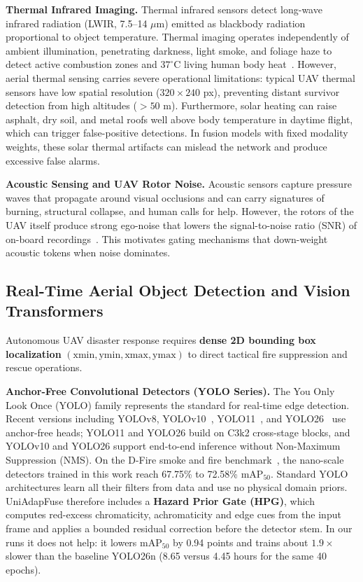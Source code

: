 \textbf{Thermal Infrared Imaging.}
Thermal infrared sensors detect long-wave infrared radiation (LWIR, 7.5--14 $\mu$m) emitted as blackbody radiation proportional to object temperature. Thermal imaging operates independently of ambient illumination, penetrating darkness, light smoke, and foliage haze to detect active combustion zones and $37^\circ\text{C}$ living human body heat~\cite{toulouse2017computer}. However, aerial thermal sensing carries severe operational limitations: typical UAV thermal sensors have low spatial resolution ($320\times240$ px), preventing distant survivor detection from high altitudes ($>50$ m). Furthermore, solar heating can raise asphalt, dry soil, and metal roofs well above body temperature in daytime flight, which can trigger false-positive detections. In fusion models with fixed modality weights, these solar thermal artifacts can mislead the network and produce excessive false alarms.

\textbf{Acoustic Sensing and UAV Rotor Noise.}
Acoustic sensors capture pressure waves that propagate around visual occlusions and can carry signatures of burning, structural collapse, and human calls for help. However, the rotors of the UAV itself produce strong ego-noise that lowers the signal-to-noise ratio (SNR) of on-board recordings~\cite{gupta2025droneaudioset}. This motivates gating mechanisms that down-weight acoustic tokens when noise dominates.

\subsection{Real-Time Aerial Object Detection and Vision Transformers}

Autonomous UAV disaster response requires \textbf{dense 2D bounding box localization} $(\text{xmin}, \text{ymin}, \text{xmax}, \text{ymax})$ to direct tactical fire suppression and rescue operations.

\textbf{Anchor-Free Convolutional Detectors (YOLO Series).}
The You Only Look Once (YOLO) family represents the standard for real-time edge detection. Recent versions including YOLOv8, YOLOv10~\cite{wang2024yolov10}, YOLO11~\cite{ultralytics2024yolo11}, and YOLO26~\cite{sapkota2025yolo26} use anchor-free heads; YOLO11 and YOLO26 build on C3k2 cross-stage blocks, and YOLOv10 and YOLO26 support end-to-end inference without Non-Maximum Suppression (NMS). On the D-Fire smoke and fire benchmark~\cite{dfire2022}, the nano-scale detectors trained in this work reach 67.75\% to 72.58\% $\text{mAP}_{50}$. Standard YOLO architectures learn all their filters from data and use no physical domain priors. UniAdapFuse therefore includes a \textbf{Hazard Prior Gate (HPG)}, which computes red-excess chromaticity, achromaticity and edge cues from the input frame and applies a bounded residual correction before the detector stem. In our runs it does not help: it lowers $\mathrm{mAP}_{50}$ by 0.94 points and trains about $1.9\times$ slower than the baseline YOLO26n (8.65 versus 4.45 hours for the same 40 epochs).

